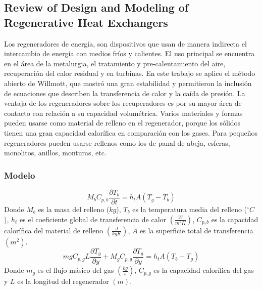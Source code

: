 \documentclass[12pt,letterpaper,final]{article}%
\begin{document}
\subsection*{Review of Design and Modeling of Regenerative
	Heat Exchangers}
	Los regeneradores de energía, son dispositivos que usan de manera indirecta el intercambio de energía con medios fríos y calientes. El uso principal se encuentra en el área de la metalurgia, el tratamiento y pre-calentamiento del aire, recuperación del calor residual y en turbinas. En este trabajo se aplico el método abierto de Willmott, que mostró una gran estabilidad y permitieron la inclusión de ecuaciones que describen la transferencia de calor y la caída de presión. La ventaja de los regeneradores sobre los recuperadores es por su mayor área de contacto con relación a su capacidad volumétrica. Varios materiales y formas pueden usarse como material de relleno en el regenerador, porque los sólidos tienen una gran capacidad calorífica en comparación con los gases. Para pequeños regeneradores pueden usarse rellenos como los de panal de abeja, esferas, monolitos, anillos, monturas, etc.  \cite{Kilkovsky2020}
\subsubsection*{Modelo}
\begin{equation}
	M_b C_{p,b}\frac{\partial T_b}{\partial t} = h_t A (T_g - T_b) 
\end{equation}
Donde $M_b$ es la masa del relleno ($kg$), $T_b$ es la temperatura media del relleno ($^\circ C$), $h_t$ es el coeficiente global de transferencia de calor $(\frac{W}{m^2 K})$, $C_{p,b}$ es la capacidad calorífica del material de relleno $(\frac{J}{kg K})$, $A$ es la superficie total de transferencia$(m^2)$.
\begin{equation}
	mg C_{p,g} L \frac{\partial T_g}{\partial y} + M_g C_{p,g} \frac{\partial T_g}{\partial y} = h_t A (T_b - T_g) 
\end{equation} 
Donde $m_g$ es el flujo másico del gas $(\frac{kg}{s})$, $C_{p,g}$ es la capacidad calorífica del gas y $L$ es la longitud del regenerador $(m)$. 
\end{document}
